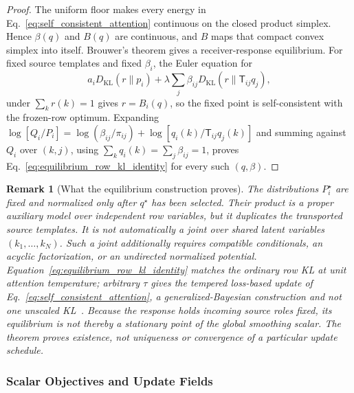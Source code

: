 \documentclass[11pt]{article}
\newtheorem{remark}{Remark}
\begin{document}
\begin{proof}
The uniform floor makes every energy in Eq.~\eqref{eq:self_consistent_attention} continuous on the closed product simplex. Hence $\beta(q)$ and $B(q)$ are continuous, and $B$ maps that compact convex simplex into itself. Brouwer's theorem gives a receiver-response equilibrium. For fixed source templates and fixed $\beta_i$, the Euler equation for
\begin{equation}
a_iD_{\mathrm{KL}}(r\|p_i)
+\lambda\sum_j\beta_{ij}D_{\mathrm{KL}}(r\|\mathsf{T}_{ij}q_j),
\label{eq:frozen_row_geometric_pool_objective}
\end{equation}
under $\sum_k r(k)=1$ gives $r=B_i(q)$, so the fixed point is self-consistent with the frozen-row optimum. Expanding $\log[Q_i/P_i]=\log(\beta_{ij}/\pi_{ij})+\log[q_i(k)/\mathsf{T}_{ij}q_j(k)]$ and summing against $Q_i$ over $(k,j)$, using $\sum_kq_i(k)=\sum_j\beta_{ij}=1$, proves Eq.~\eqref{eq:equilibrium_row_kl_identity} for every such $(q,\beta)$.
\end{proof}

\begin{remark}[What the equilibrium construction proves]
\label{rem:equilibrium_model_scope}
The distributions $P_i^\star$ are fixed and normalized only after $q^\star$ has been selected. Their product is a proper auxiliary model over independent row variables, but it duplicates the transported source templates. It is not automatically a joint over shared latent variables $(k_1,\ldots,k_N)$. Such a joint additionally requires compatible conditionals, an acyclic factorization, or an undirected normalized potential. Equation~\eqref{eq:equilibrium_row_kl_identity} matches the ordinary row KL at unit attention temperature; arbitrary $\tau$ gives the tempered loss-based update of Eq.~\eqref{eq:self_consistent_attention}, a generalized-Bayesian construction and not one unscaled KL~\cite{BissiriHolmesWalker2016}. Because the response holds incoming source roles fixed, its equilibrium is not thereby a stationary point of the global smoothing scalar. The theorem proves existence, not uniqueness or convergence of a particular update schedule.
\end{remark}

\subsubsection{Scalar Objectives and Update Fields}
\end{document}
